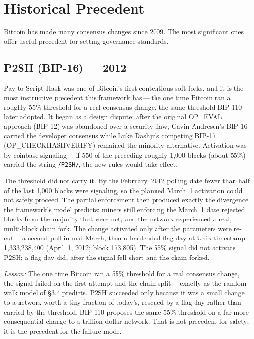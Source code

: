 \documentclass[11pt, twoside, openright]{book}
\newcommand{\sect}[1]{\S#1}
\begin{document}
\chapter{Historical Precedent}
\label{ch:history}

Bitcoin has made many consensus changes since 2009. The most significant ones offer useful precedent for setting governance standards.

\section{P2SH (BIP-16) --- 2012}

Pay-to-Script-Hash was one of Bitcoin's first contentious soft forks, and it is the most instructive precedent this framework has\,---\,the one time Bitcoin ran a roughly 55\% threshold for a real consensus change, the same threshold BIP-110 later adopted. It began as a design dispute: after the original OP\_EVAL approach (BIP-12) was abandoned over a security flaw, Gavin Andresen's BIP-16 carried the developer consensus while Luke Dashjr's competing BIP-17 (OP\_CHECKHASHVERIFY) remained the minority alternative. Activation was by coinbase signaling\,---\,if 550 of the preceding roughly 1{,}000 blocks (about 55\%) carried the string \texttt{/P2SH/}, the new rules would take effect.

The threshold did not carry it. By the February~2012 polling date fewer than half of the last 1{,}000 blocks were signaling, so the planned March~1 activation could not safely proceed. The partial enforcement then produced exactly the divergence the framework's model predicts: miners still enforcing the March~1 date rejected blocks from the majority that were not, and the network experienced a real, multi-block chain fork. The change activated only after the parameters were re-cut\,---\,a second poll in mid-March, then a hardcoded flag day at Unix timestamp 1{,}333{,}238{,}400 (April~1, 2012; block 173{,}805). The 55\% signal did not activate P2SH; a flag day did, after the signal fell short and the chain forked.

\textit{Lesson:} The one time Bitcoin ran a 55\% threshold for a real consensus change, the signal failed on the first attempt and the chain split\,---\,exactly as the random-walk model of \sect{3.4} predicts. P2SH succeeded only because it was a small change to a network worth a tiny fraction of today's, rescued by a flag day rather than carried by the threshold. BIP-110 proposes the same 55\% threshold on a far more consequential change to a trillion-dollar network. That is not precedent for safety; it is the precedent for the failure mode.
\end{document}
